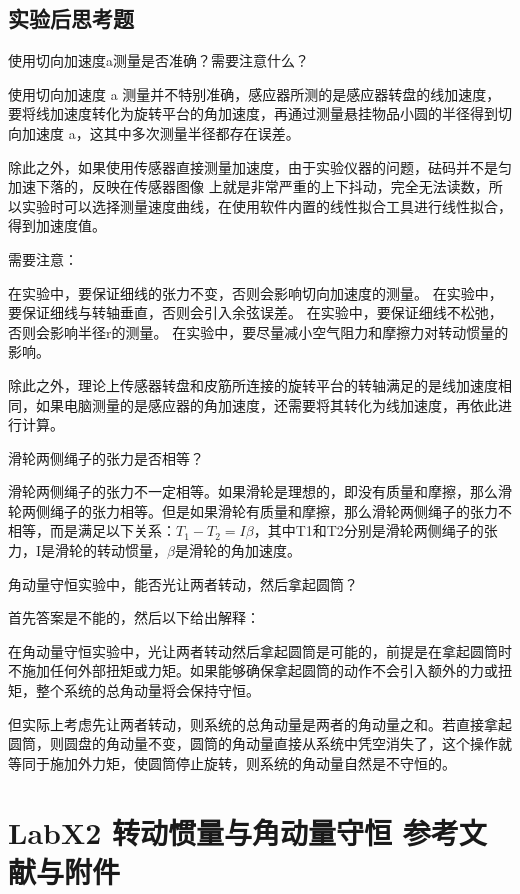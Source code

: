 \documentclass[dvipsnames, svgnames,a4paper,11pt]{article}
\begin{document}
	\clearpage
	\subsection{实验后思考题}
	\begin{question}
		使用切向加速度a测量是否准确？需要注意什么？
	\end{question}
	使用切向加速度 a 测量并不特别准确，感应器所测的是感应器转盘的线加速度，要将线加速度转化为旋转平台的角加速度，再通过测量悬挂物品小圆的半径得到切向加速度 a，这其中多次测量半径都存在误差。
	
	除此之外，如果使用传感器直接测量加速度，由于实验仪器的问题，砝码并不是匀加速下落的，反映在传感器图像
	上就是非常严重的上下抖动，完全无法读数，所以实验时可以选择测量速度曲线，在使用软件内置的线性拟合工具进行线性拟合，得到加速度值。
	
	需要注意：
	
	在实验中，要保证细线的张力不变，否则会影响切向加速度的测量。
	在实验中，要保证细线与转轴垂直，否则会引入余弦误差。
	在实验中，要保证细线不松弛，否则会影响半径r的测量。
	在实验中，要尽量减小空气阻力和摩擦力对转动惯量的影响。
	
	除此之外，理论上传感器转盘和皮筋所连接的旋转平台的转轴满足的是线加速度相同，如果电脑测量的是感应器的角加速度，还需要将其转化为线加速度，再依此进行计算。
	
	\begin{question}
		滑轮两侧绳子的张力是否相等？
	\end{question}
	滑轮两侧绳子的张力不一定相等。如果滑轮是理想的，即没有质量和摩擦，那么滑轮两侧绳子的张力相等。但是如果滑轮有质量和摩擦，那么滑轮两侧绳子的张力不相等，而是满足以下关系：$T_1-T_2=I\beta$，其中T1和T2分别是滑轮两侧绳子的张力，I是滑轮的转动惯量，$\beta$是滑轮的角加速度。
	
	\begin{question}
		角动量守恒实验中，能否光让两者转动，然后拿起圆筒？
	\end{question}
	首先答案是不能的，然后以下给出解释：
	
	在角动量守恒实验中，光让两者转动然后拿起圆筒是可能的，前提是在拿起圆筒时不施加任何外部扭矩或力矩。如果能够确保拿起圆筒的动作不会引入额外的力或扭矩，整个系统的总角动量将会保持守恒。
	
	但实际上考虑先让两者转动，则系统的总角动量是两者的角动量之和。若直接拿起圆筒，则圆盘的角动量不变，圆筒的角动量直接从系统中凭空消失了，这个操作就等同于施加外力矩，使圆筒停止旋转，则系统的角动量自然是不守恒的。
	
	\clearpage
	\section{LabX2 转动惯量与角动量守恒 \quad\heiti 参考文献与附件}
\end{document}
